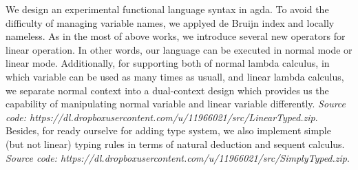 \documentclass[a4paper]{article}
\begin{document}

We design an experimental functional language syntax in agda. To avoid the difficulty of managing variable names, we applyed de Bruijn index and locally nameless. As in the most of above works, we introduce several new operators for linear operation. In other words, our language can be executed in normal mode or linear mode. Additionally, for supporting both of normal lambda calculus, in which variable can be used as many times as usuall, and linear lambda calculus, we separate normal context into a dual-context design which provides us the capability of manipulating normal variable and linear variable differently. \textit{Source code: https://dl.dropboxusercontent.com/u/11966021/src/LinearTyped.zip}. Besides, for ready ourselve for adding type system, we also implement simple (but not linear) typing rules in terms of natural deduction and sequent calculus. \textit{Source code: https://dl.dropboxusercontent.com/u/11966021/src/SimplyTyped.zip}.



\end{document}
